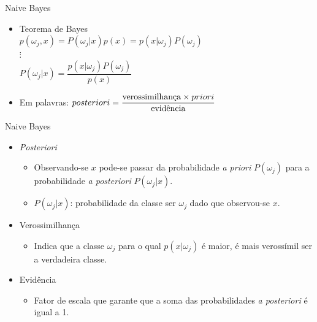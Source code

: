 \documentclass{libs/ufc_format}
\begin{document}
\begin{frame}{Naive Bayes}
    \begin{itemize}
        \item<1-> Teorema de Bayes\\
        $p(\omega_{j},x) = P(\omega_{j} | x)p(x) = p(x | \omega_{j})P(\omega_{j})$\\
		\hspace{38pt} $\vdots$\\
		$P(\omega_{j} | x) = \dfrac{p(x | \omega_{j})P(\omega_{j})}{p(x)}$
		\item<2-> Em palavras: $posteriori = \dfrac{\hbox{verossimilhança} \times priori}{\hbox{evidência}}$
    \end{itemize}
\end{frame}

\begin{frame}{Naive Bayes}
    \begin{itemize}
        \item \textit{Posteriori}
            \begin{itemize}
                \justifying
                \item<2-> Observando-se $x$ pode-se passar da probabilidade \textit{a priori} $P(\omega_{j})$ para a probabilidade \textit{a posteriori} $P(\omega_{j}|x)$.
                \item<3-> $P(\omega_{j}|x)$: probabilidade da classe ser $\omega_{j}$ dado que observou-se $x$.
            \end{itemize}
        \item<4-> Verossimilhança
            \begin{itemize}
                \justifying
                \item<5-> Indica que a classe $\omega_{j}$ para o qual $p(x|\omega_{j})$ é maior, é mais verossímil ser a verdadeira classe.
            \end{itemize}
        \item<6-> Evidência
            \begin{itemize}
                \item<7> Fator de escala que garante que a soma das probabilidades \textit{a posteriori} é igual a 1.
            \end{itemize}
    \end{itemize}
\end{frame}
\end{document}
